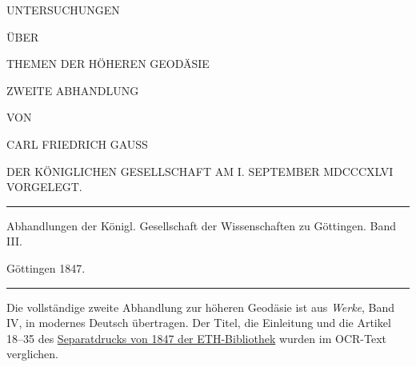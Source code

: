 \clearpage
{}
\thispagestyle{empty}
\vspace*{.3in}
\begin{center}
{\large UNTERSUCHUNGEN}\par\bigskip
ÜBER\par\bigskip
{\Large THEMEN DER HÖHEREN GEODÄSIE}\par\vspace{25pt}
ZWEITE ABHANDLUNG\par\vspace{35pt}
VON\par\vspace{35pt}
{\large CARL FRIEDRICH GAUSS}\par\vspace{35pt}
{\small DER KÖNIGLICHEN GESELLSCHAFT AM I. SEPTEMBER MDCCCXLVI VORGELEGT.}
\end{center}
\vfill
\begin{center}
\rule{.8\linewidth}{.3pt}\par\smallskip
Abhandlungen der Königl. Gesellschaft der Wissenschaften zu Göttingen. Band III.\par
Göttingen 1847.\par\smallskip
\rule{.8\linewidth}{.3pt}
\end{center}
\par\bigskip\begingroup\fontsize{9}{11}\selectfont\raggedright\noindent Die vollständige zweite Abhandlung zur höheren Geodäsie ist aus \textit{Werke}, Band IV, in modernes Deutsch übertragen. Der Titel, die Einleitung und die Artikel 18--35 des \href{https://doi.org/10.3931/e-rara-2861}{Separatdrucks von 1847 der ETH-Bibliothek} wurden im OCR-Text verglichen.\par\endgroup
\clearpage
